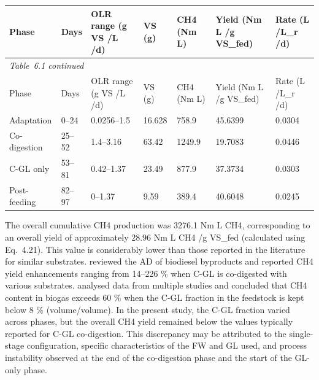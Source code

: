 \documentclass[12pt, a4paper, oneside]{report}
\begin{document}
\begingroup
\tablesetup
\footnotesize
\setlength{\tabcolsep}{3pt}

    \begin{tabular}{lllllll}

        \caption{Summary of the performance of the experiment}
         \\

        \toprule
        Phase &
        Days &
        OLR range (g VS /L /d) &
        VS (g) &
        CH4 (Nm L) &
        Yield (Nm L /g VS_fed) &
        Rate (L /L_r /d) \\
        \midrule
        \endfirsthead

        \multicolumn{7}{l}{\textit{Table 6.1 continued}} \\
        \toprule
        Phase &
        Days &
        OLR range (g VS /L /d) &
        VS (g) &
        CH4 (Nm L) &
        Yield (Nm L /g VS_fed) &
        Rate (L /L_r /d) \\
        \midrule
        \endhead

        \bottomrule
        \endlastfoot

        Adaptation &
         0–24 &
         0.0256–1.5 &
         16.628 &
         758.9 &
         45.6399 &
         0.0304 \\
Co-digestion &
         25–52 &
         1.4–3.16 &
         63.42 &
         1249.9 &
         19.7083 &
         0.0446 \\
C-GL only &
         53–81 &
         0.42–1.37 &
         23.49 &
         877.9 &
         37.3734 &
         0.0303 \\
Post-feeding &
         82–97 &
         0–1.37 &
         9.59 &
         389.4 &
         40.6048 &
         0.0245 \\

    \end{tabular}

\endgroup

The overall cumulative CH4 production was 3276.1 Nm L CH4, corresponding to an overall yield of approximately 28.96 Nm L CH4 /g VS_fed (calculated using Eq. 4.21). This value is considerably lower than those reported in the literature for similar substrates. \textcite{gebreegziabher2025} reviewed the AD of biodiesel byproducts and reported CH4 yield enhancements ranging from 14–226 \% when C-GL is co-digested with various substrates. \textcite{tomczak2025} analysed data from multiple studies and concluded that CH4 content in biogas exceeds 60 \% when the C-GL fraction in the feedstock is kept below 8 \% (volume/volume). In the present study, the C-GL fraction varied across phases, but the overall CH4 yield remained below the values typically reported for C-GL co-digestion. This discrepancy may be attributed to the single-stage configuration, specific characteristics of the FW and GL used, and process instability observed at the end of the co-digestion phase and the start of the GL-only phase.
\end{document}
